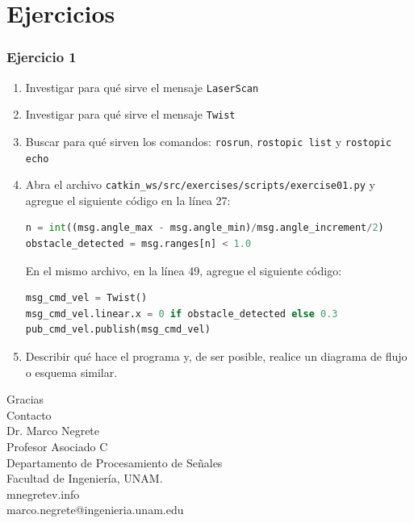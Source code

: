 \documentclass[10pt,spanish,aspectratio=1610]{beamer}
\begin{document}
\section{Ejercicios}
\begin{frame}[containsverbatim]\frametitle{Ejercicio 1}
  \begin{enumerate}
  \item Investigar para qué sirve el mensaje \texttt{LaserScan}
  \item Investigar para qué sirve el mensaje \texttt{Twist}
  \item Buscar para qué sirven los comandos: \texttt{rosrun}, \texttt{rostopic list} y \texttt{rostopic echo}
  \item Abra el archivo \texttt{catkin\_ws/src/exercises/scripts/exercise01.py} y agregue el siguiente código en la línea 27:
  \begin{lstlisting}[language=Python,firstnumber=27]
n = int((msg.angle_max - msg.angle_min)/msg.angle_increment/2)
obstacle_detected = msg.ranges[n] < 1.0
  \end{lstlisting}
  En el mismo archivo, en la línea 49, agregue el siguiente código:
  \begin{lstlisting}[language=Python,firstnumber=49]
msg_cmd_vel = Twist()
msg_cmd_vel.linear.x = 0 if obstacle_detected else 0.3
pub_cmd_vel.publish(msg_cmd_vel)
  \end{lstlisting}
  \item Describir qué hace el programa y, de ser posible, realice un diagrama de flujo o esquema similar. 
  \end{enumerate}
\end{frame}



\begin{frame}
  \Huge{Gracias}
  \[\]
  \Large{Contacto}
  \[\]
  \large
  Dr. Marco Negrete\\
  Profesor Asociado C\\
  Departamento de Procesamiento de Señales\\
  Facultad de Ingeniería, UNAM.
\[\]
mnegretev.info\\
marco.negrete@ingenieria.unam.edu\\
\end{frame}
\end{document}
